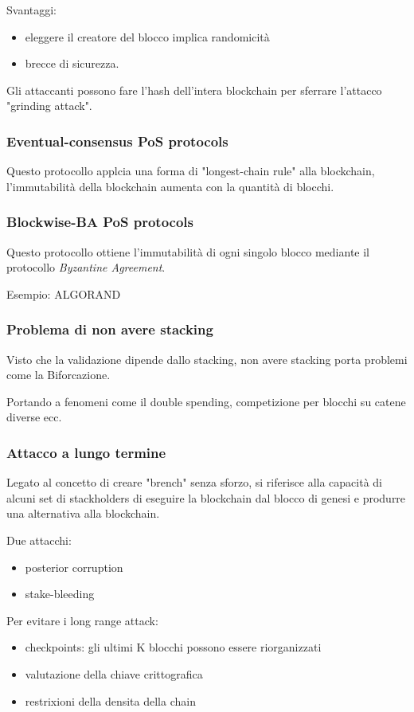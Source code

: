 Svantaggi:
\begin{itemize}
    \item eleggere il creatore del blocco implica randomicità
    \item brecce di sicurezza.
\end{itemize}

Gli attaccanti possono fare l'hash dell'intera blockchain per sferrare l'attacco "grinding attack".

\subsubsection{Eventual-consensus PoS protocols}
Questo protocollo applcia una forma di "longest-chain
rule" alla blockchain, l'immutabilità della blockchain aumenta con la quantità di blocchi.

\subsubsection{Blockwise-BA PoS protocols}
Questo protocollo ottiene l'immutabilità di ogni singolo blocco mediante il protocollo \textit{Byzantine Agreement}.

Esempio: ALGORAND


\subsubsection{Problema di non avere stacking}
Visto che la validazione dipende dallo stacking, non avere stacking porta problemi come la Biforcazione.

Portando a fenomeni come il double spending, competizione per blocchi su catene diverse ecc.

\subsubsection{Attacco a lungo termine}
Legato al concetto di creare "brench" senza sforzo, si riferisce alla capacità di alcuni set di stackholders di eseguire la blockchain
dal blocco di genesi e produrre una alternativa alla blockchain.

Due attacchi:
\begin{itemize}
    \item posterior corruption
    \item stake-bleeding
\end{itemize}

Per evitare i long range attack:
\begin{itemize}
    \item checkpoints: gli ultimi K blocchi possono essere riorganizzati
    \item valutazione della chiave crittografica
    \item restrixioni della densita della chain
\end{itemize}

